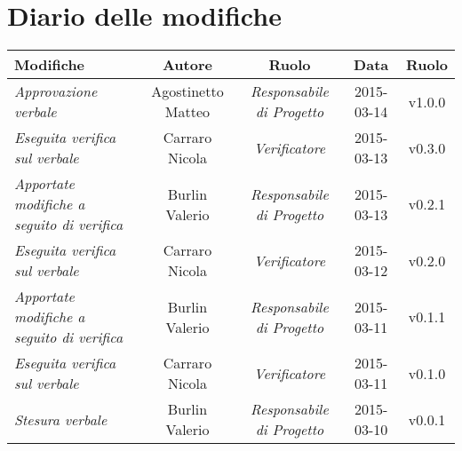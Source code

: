 \newpage
\section*{Diario delle modifiche}

\begin{table}[h]
\centering
\begin{tabular}{|p{}|c|c|c|c|}
	\toprule
		\textbf{Modifiche} & \textbf{Autore} & \textbf{Ruolo} & \textbf{Data} & \textbf{Ruolo} \\
	\midrule
	\midrule
		\textit{Approvazione verbale} & Agostinetto Matteo & \textit{Responsabile di Progetto} & 2015-03-14 & v1.0.0 \\
	\midrule
		\textit{Eseguita verifica sul verbale} & Carraro Nicola & \textit{Verificatore} & 2015-03-13 & v0.3.0 \\							
	\midrule
		\textit{Apportate modifiche a seguito di verifica} & Burlin Valerio & \textit{Responsabile di Progetto} & 2015-03-13 & v0.2.1 \\
	\midrule
		\textit{Eseguita verifica sul verbale} & Carraro Nicola & \textit{Verificatore} & 2015-03-12 & v0.2.0 \\
	\midrule
		\textit{Apportate modifiche a seguito di verifica} & Burlin Valerio & \textit{Responsabile di Progetto} & 2015-03-11 & v0.1.1 \\
	\midrule
		\textit{Eseguita verifica sul verbale} & Carraro Nicola & \textit{Verificatore} & 2015-03-11 & v0.1.0 \\
	\midrule
		\textit{Stesura verbale} & Burlin Valerio & \textit{Responsabile di Progetto} & 2015-03-10 & v0.0.1 \\
	\bottomrule
\end{tabular}	
\end{table}

\newpage